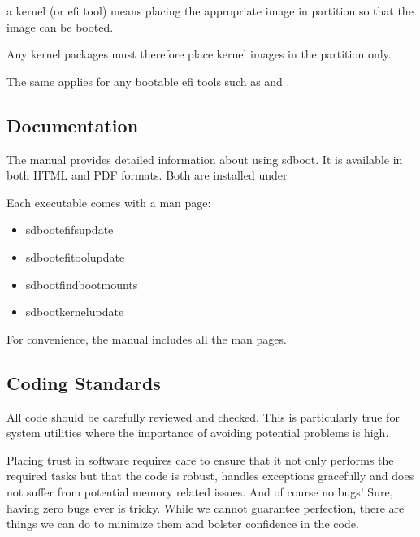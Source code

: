 \documentclass[letterpaper,11pt,english]{sphinxmanual}
\begin{document}
\sphinxAtStartPar
{} a kernel (or efi tool) means placing the appropriate image in  partition so
that the image can be booted.

\sphinxAtStartPar
Any kernel packages must therefore place kernel images in the  partition only.

\sphinxAtStartPar
The same applies for any bootable efi tools such as  and .


\subsection{Documentation}
\label{\detokenize{Readme:documentation}}
\sphinxAtStartPar
The manual provides detailed information about using sd\sphinxhyphen{}boot.
It is available in both HTML and PDF formats.
Both are installed under 

\sphinxAtStartPar
Each executable comes with a man page:
\begin{itemize}
\item {} 
\sphinxAtStartPar
sd\sphinxhyphen{}boot\sphinxhyphen{}efifs\sphinxhyphen{}update

\item {} 
\sphinxAtStartPar
sd\sphinxhyphen{}boot\sphinxhyphen{}efi\sphinxhyphen{}tool\sphinxhyphen{}update

\item {} 
\sphinxAtStartPar
sd\sphinxhyphen{}boot\sphinxhyphen{}find\sphinxhyphen{}boot\sphinxhyphen{}mounts

\item {} 
\sphinxAtStartPar
sd\sphinxhyphen{}boot\sphinxhyphen{}kernel\sphinxhyphen{}update

\end{itemize}

\sphinxAtStartPar
For convenience, the manual includes all the man pages.


\subsection{Coding Standards}
\label{\detokenize{Readme:coding-standards}}
\sphinxAtStartPar
All code should be carefully reviewed and checked. This is particularly true for
system utilities where the importance of avoiding potential problems is high.

\sphinxAtStartPar
Placing trust in software requires care to ensure that it not only performs
the required tasks but that the code is robust, handles exceptions gracefully and does
not suffer from potential memory related issues. And of course no bugs!
Sure, having zero bugs ever is tricky. While we cannot guarantee perfection,
there are things we can do to minimize them and bolster confidence in the code.
\end{document}
